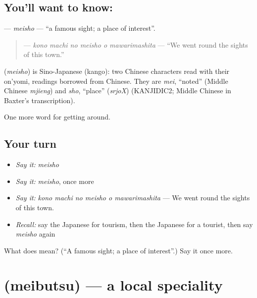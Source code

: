 \subsection*{You'll want to know: }
\textbf{} — \emph{meisho} — \textquotedblleft{}a famous sight; a place of interest\textquotedblright{}.

\begin{quote}
\textbf{   } — \emph{kono machi no meisho o mawarimashita} — \textquotedblleft{}We went round the sights of this town.\textquotedblright{}
\end{quote}

\begin{cousinweb}
\textbf{} (\emph{meisho}) is Sino-Japanese (kango): two Chinese characters read with their on'yomi, readings borrowed from Chinese. They are \emph{mei}, \textquotedblleft{}noted\textquotedblright{} (Middle Chinese \emph{mjieng}) and \emph{sho}, \textquotedblleft{}place\textquotedblright{} (\emph{srjoX}) (KANJIDIC2; Middle Chinese in Baxter's transcription).
\end{cousinweb}

\begin{grammarlens}[title={What you've built}]
One more word for getting around.
\end{grammarlens}

\subsection*{Your turn}
\begin{itemize}
\raggedright
  \item \emph{Say it:} \emph{meisho}
  \item \emph{Say it:} \emph{meisho}, once more
  \item \emph{Say it:} \emph{kono machi no meisho o mawarimashita} — We went round the sights of this town.
  \item \emph{Recall:} say the Japanese for tourism, then the Japanese for a tourist, then say \emph{meisho} again
\end{itemize}

\begin{tcolorbox}[breakable,colback=teal!4,colframe=teal!35!black,title={Before you move on}]
What does  mean? (\textquotedblleft{}A famous sight; a place of interest\textquotedblright{}.) Say it once more.
\end{tcolorbox}
\section[\texorpdfstring{\ja{めいぶつ} (meibutsu)}{めいぶつ (meibutsu)}]{ (meibutsu) — a local speciality}

